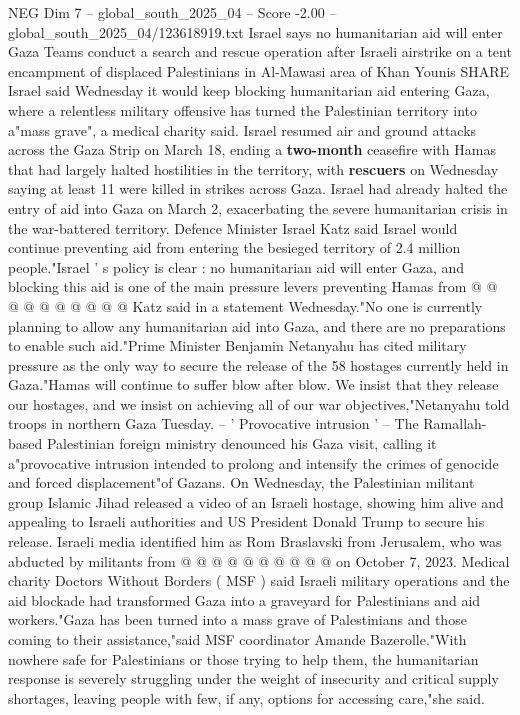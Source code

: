 \begin{textsample}{NEG Dim 7 – global\_south\_2025\_04 – Score -2.00 – global\_south\_2025\_04/123618919.txt}  \label{ex:f7_neg_044}
Israel says no humanitarian aid will enter Gaza Teams conduct a search and rescue operation after Israeli airstrike on a tent encampment of displaced Palestinians in Al-Mawasi area of Khan Younis SHARE Israel said Wednesday it would keep blocking humanitarian aid entering Gaza, where a relentless military offensive has turned the Palestinian territory into a"mass grave", a medical charity said.
Israel resumed air and ground attacks across the Gaza Strip on March 18, ending a \textbf{two-month} ceasefire with Hamas that had largely halted hostilities in the territory, with \textbf{rescuers} on Wednesday saying at least 11 were killed in strikes across Gaza.
Israel had already halted the entry of aid into Gaza on March 2, exacerbating the severe humanitarian crisis in the war-battered territory.
Defence Minister Israel Katz said Israel would continue preventing aid from entering the besieged territory of 2.4 million people."Israel ' s policy is clear : no humanitarian aid will enter Gaza, and blocking this aid is one of the main pressure levers preventing Hamas from @ @ @ @ @ @ @ @ @ @ Katz said in a statement Wednesday."No one is currently planning to allow any humanitarian aid into Gaza, and there are no preparations to enable such aid."Prime Minister Benjamin Netanyahu has cited military pressure as the only way to secure the release of the 58 hostages currently held in Gaza."Hamas will continue to suffer blow after blow.
We insist that they release our hostages, and we insist on achieving all of our war objectives,"Netanyahu told troops in northern Gaza Tuesday. -- ' Provocative intrusion ' -- The Ramallah-based Palestinian foreign ministry denounced his Gaza visit, calling it a"provocative intrusion intended to prolong and intensify the crimes of genocide and forced displacement"of Gazans.
On Wednesday, the Palestinian militant group Islamic Jihad released a video of an Israeli hostage, showing him alive and appealing to Israeli authorities and US President Donald Trump to secure his release.
Israeli media identified him as Rom Braslavski from Jerusalem, who was abducted by militants from @ @ @ @ @ @ @ @ @ @ on October 7, 2023.
Medical charity Doctors Without Borders ( MSF ) said Israeli military operations and the aid blockade had transformed Gaza into a graveyard for Palestinians and aid workers."Gaza has been turned into a mass grave of Palestinians and those coming to their assistance,"said MSF coordinator Amande Bazerolle."With nowhere safe for Palestinians or those trying to help them, the humanitarian response is severely struggling under the weight of insecurity and critical supply shortages, leaving people with few, if any, options for accessing care,"she said.

\end{textsample}
